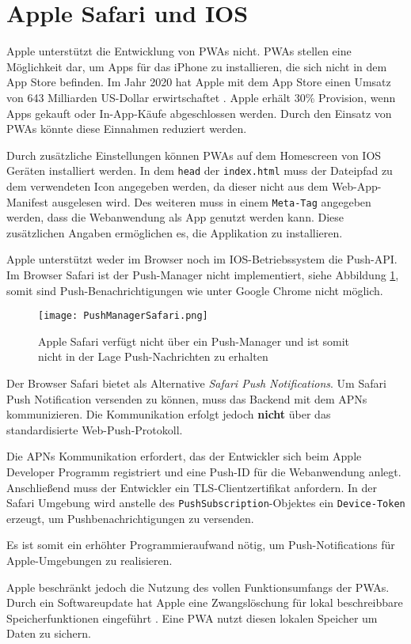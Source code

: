 \section{Apple Safari und IOS}

Apple unterstützt die Entwicklung von PWAs nicht. PWAs stellen  eine Möglichkeit dar, um Apps für das iPhone zu installieren, die sich nicht in dem App Store befinden. Im Jahr 2020 hat Apple mit dem App Store einen Umsatz von 643 Milliarden US-Dollar erwirtschaftet \cite{Kirchenbauer2021}. Apple erhält 30\% Provision, wenn Apps gekauft oder In-App-Käufe abgeschlossen werden. Durch den Einsatz von PWAs könnte diese Einnahmen reduziert werden.

Durch zusätzliche Einstellungen können PWAs auf dem Homescreen von IOS Geräten installiert werden. In dem \texttt{head} der \texttt{index.html} muss der Dateipfad zu dem verwendeten Icon angegeben werden, da dieser nicht aus dem Web-App-Manifest ausgelesen wird. 
Des weiteren muss in einem \texttt{Meta-Tag} angegeben werden, dass die Webanwendung als App genutzt werden kann. Diese zusätzlichen Angaben ermöglichen es, die Applikation zu installieren. 

Apple unterstützt weder im Browser noch im IOS-Betriebssystem die Push-API. Im Browser Safari ist der Push-Manager nicht implementiert, siehe Abbildung \ref{img:PushManagerBrowser}, somit sind Push-Benachrichtigungen wie unter Google Chrome nicht möglich. 

\begin{figure}[!htb]
    \centering
    \texttt{[image: PushManagerSafari.png]}
    \caption{Apple Safari verfügt nicht über ein Push-Manager und ist somit nicht in der Lage Push-Nachrichten zu erhalten}
    \label{img:PushManagerBrowser}
\end{figure}


Der Browser Safari bietet als Alternative \textit{Safari Push Notifications}. Um Safari Push Notification versenden zu können, muss das Backend mit dem \ac*{APNs} kommunizieren. Die Kommunikation erfolgt jedoch \textbf{nicht} über das standardisierte Web-Push-Protokoll.

Die APNs Kommunikation erfordert, das der Entwickler sich beim Apple Developer Programm registriert und eine Push-ID für die Webanwendung anlegt. Anschließend muss der Entwickler ein \ac*{TLS}-Clientzertifikat anfordern. In der Safari Umgebung wird anstelle des \texttt{PushSubscription}-Objektes ein \texttt{Device-Token} erzeugt, um Pushbenachrichtigungen zu versenden. 

Es ist somit ein erhöhter Programmieraufwand nötig, um Push-Notifications für Apple-Umgebungen zu realisieren.


Apple beschränkt jedoch die Nutzung des vollen Funktionsumfangs der PWAs. Durch ein Softwareupdate hat Apple eine Zwangslöschung für lokal beschreibbare Speicherfunktionen eingeführt \cite{t3n2020}. Eine PWA nutzt diesen lokalen Speicher um Daten zu sichern.